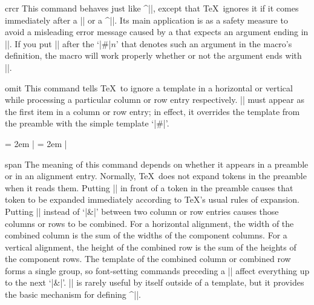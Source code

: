 \begindesc
\cts crcr {}
\explain
This command behaves just like ^|\cr|, except that \TeX\ ignores it if
it comes immediately after a |\cr| or a ^|\noalign|.
Its main application is as a safety measure to avoid a misleading error
message caused by a  that expects an argument ending in |\cr|.
If you put |\crcr| after the `|#|$n$' that denotes such an argument
in the macro's definition, the
macro will work properly whether or not the argument ends with |\cr|.
\enddesc

\begindesc
\cts omit {}
\explain
This command tells \TeX\ to ignore a template in a horizontal or vertical
 while processing a particular column or row entry
respectively.
|\omit| must appear as the first item in a column or row entry; in effect,
it overrides the template from the preamble with the simple
template `|#|'.


\example
\tabskip = 2em
|
\produces
\tabskip = 2em
\nextexample
{\hsize=1.2in \parindent=0pt 
}
|
\produces
{\hsize=1.2in \parindent=0pt \leftskip=0pt
}
\endexample
\enddesc

\begindesc
\cts span {}
\explain
The meaning of this command depends on whether it appears in a preamble
or in an alignment entry.
\ulist
\li Normally, \TeX\ does not expand tokens in the preamble
when it reads them.
Putting |\span| in front of a token in the preamble causes
that token to be expanded immediately according to \TeX's usual rules
of  expansion.
\li Putting |\span| instead of `|&|' between two column or row entries
causes those columns or rows to be combined.
For a horizontal alignment,
the width of the combined column is the sum of the
widths of the component columns.
For a vertical alignment,
the height of the combined row is the sum of the
heights of the component rows.
The template of the combined column or combined row forms a single group,
so font-setting commands preceding a |\span| affect everything up to
the next `|&|'.
\endulist
\noindent
|\span| is rarely useful by itself outside of a template,
but it provides the basic mechanism
for defining ^|\multispan|.
\enddesc

